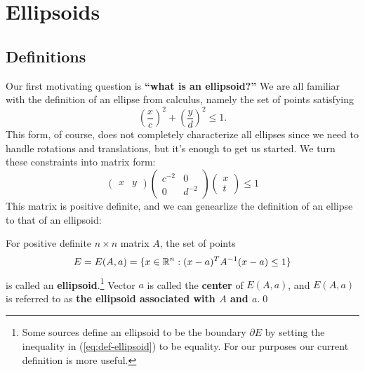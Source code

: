 
\section{Ellipsoids}


\subsection{Definitions}
Our first motivating question is \textbf{``what is an ellipsoid?''}
We are all familiar with the definition of an ellipse from
calculus, namely the set of points satisfying
%
\begin{equation}\label{eq:naive-ellipse}
  \left(\frac xc\right)^2 + \left(\frac yd\right)^2 \leq 1.
\end{equation}
%
This form, of course, does not completely characterize all ellipses since we
need to handle rotations and translations, but it's enough to get us started. We
turn these constraints into matrix form:
%
\begin{equation}\label{eq:naive-ellipse-matrix}
  \left(\begin{matrix}x&y\end{matrix}\right)
  \left(\begin{matrix}c^{-2} &0\\0&d^{-2}\end{matrix}\right)
    \left(\begin{matrix}x\\t\end{matrix}\right)\leq 1
\end{equation}
%
This matrix is positive definite, and we can genearlize the definition of an
ellipse to that of an ellipsoid:

\begin{defbox} 
  \begin{definition}[ellipsoid, \(E(A, a)\)]

    For positive definite \(n\times n\) matrix \(A\), the set of points
    \begin{equation}\label{eq:def-ellipsoid}
      E = E(A,a) = \{x \in \mathbb R^n : (x - a)^T A^{-1} (x - a) \leq 1\}
    \end{equation}
    is called an \textbf{ellipsoid}.\footnote{Some sources define an ellipsoid
    to be the boundary \(\partial E\) by setting the inequality in
    (\ref{eq:def-ellipsoid}) to be equality. For our purposes our current
    definition is more useful.}
    Vector \(a\) is called the \textbf{center}
    of \(E(A, a)\), and \(E(A,a)\) is referred to as \textbf{the ellipsoid
    associated with \(A\) and \(a\)}.\qed
  \end{definition}
\end{defbox}

